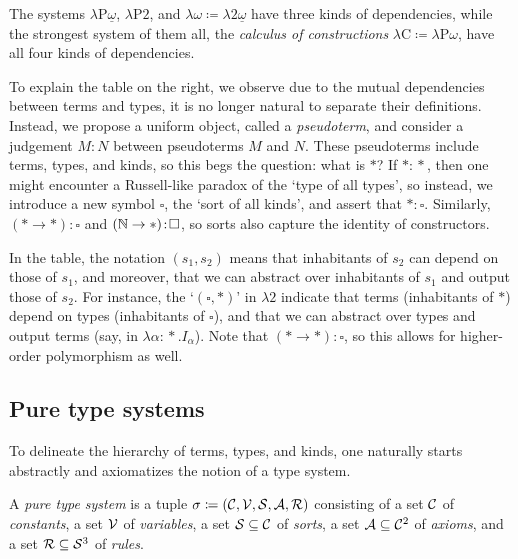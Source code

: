 \documentclass[reqno, twoside]{article}
\begin{document}
    The systems $\lambda\mathrm{P}\underline{\omega}$, $\lambda\mathrm{P}2$, and $\lambda\omega\coloneqq\lambda2\underline{\omega}$ have three kinds of dependencies, while the strongest system of them all, the \textit{calculus of constructions} $\lambda\mathrm{C}\coloneqq\lambda\mathrm{P}\omega$, have all four kinds of dependencies.

    To explain the table on the right, we observe due to the mutual dependencies between terms and types, it is no longer natural to separate their definitions. Instead, we propose a uniform object, called a \textit{pseudoterm}, and consider a judgement $M\!:\!N$ between pseudoterms $M$ and $N$. These pseudoterms include terms, types, and kinds, so this begs the question: what is $\ast$? If $\ast\!:\!\ast$, then one might encounter a Russell-like paradox of the `type of all types', so instead, we introduce a new symbol $\square$, the `sort of all kinds', and assert that $\ast\!:\!\square$. Similarly, $(\ast\to\ast)\!:\!\square$ and $(\mathbb{N}\to\ast)\!:\!\square$, so sorts also capture the identity of constructors.

    In the table, the notation $(s_1,s_2)$ means that inhabitants of $s_2$ can depend on those of $s_1$, and moreover, that we can abstract over inhabitants of $s_1$ and output those of $s_2$. For instance, the `$(\square,\ast)$' in $\lambda2$ indicate that terms (inhabitants of $\ast$) depend on types (inhabitants of $\square$), and that we can abstract over types and output terms (say, in $\lambda\alpha\!:\!\ast.I_\alpha$). Note that $(\ast\to\ast)\!:\!\square$, so this allows for higher-order polymorphism as well.

    \subsection*{Pure type systems}

    To delineate the hierarchy of terms, types, and kinds, one naturally starts abstractly and axiomatizes the notion of a type system.

    \begin{definition}
        A \textit{pure type system} is a tuple $\sigma\coloneqq(\mathcal{C},\mathcal{V},\mathcal{S},\mathcal{A},\mathcal{R})$ consisting of a set $\mathcal{C}$ of \textit{constants}, a set $\mathcal{V}$ of \textit{variables}, a set $\mathcal{S}\subseteq\mathcal{C}$ of \textit{sorts}, a set $\mathcal{A}\subseteq\mathcal{C}^2$ of \textit{axioms}, and a set $\mathcal{R}\subseteq\mathcal{S}^3$ of \textit{rules}.
    \end{definition}
\end{document}
